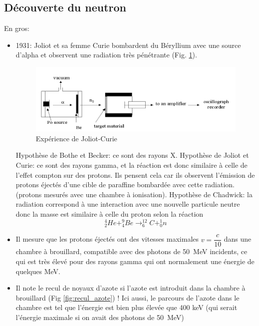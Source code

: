 \subsection{Découverte du neutron}
En gros:
\begin{itemize}
    \item 1931: Joliot et sa femme Curie bombardent du Béryllium avec une source d'alpha et observent une radiation très pénétrante (Fig. \ref{fig:joliot_curie}).

    \begin{figure}[H]
        \centering
        \includegraphics[scale=0.99]{Images1/joliotcurie.PNG}
        \caption{Expérience de Joliot-Curie}
        \label{fig:joliot_curie}
    \end{figure}

    Hypothèse de Bothe et Becker: ce sont des rayons X. Hypothèse de Joliot et Curie: ce sont des rayons gamma, et la réaction est donc similaire à celle de l'effet compton sur des protons. Ils pensent cela car ils observent l'émission de protons éjectés d'une cible de paraffine bombardée avec cette radiation. (protons mesurés avec une chambre à ionisation). Hypothèse de Chadwick: la radiation correspond à une interaction avec une nouvelle particule neutre donc la masse est similaire à celle du proton selon la réaction
    \[
        ^{4}_{2}He + ^{9}_{4}Be \rightarrow ^{12}_{6}C + ^{1}_{0}n
    \]

    \item Il mesure que les protons éjectés ont des vitesses maximales $v=\dfrac{c}{10}$ dans une chambre à brouillard, compatible avec des photons de \SI{50}{MeV} incidents, ce qui est très élevé pour des rayons gamma qui ont normalement une énergie de quelques \si{MeV}.

    \item Il note le recul de noyaux d'azote si l'azote est introduit dans la chambre à brouillard (Fig \ref{fig:recul_azote}) ! Ici aussi, le parcours de l'azote dans le chambre est tel que l'énergie est bien plus élevée que 400 \si{keV} (qui serait l'énergie maximale si on avait des photons de \SI{50}{MeV})



\end{itemize}
